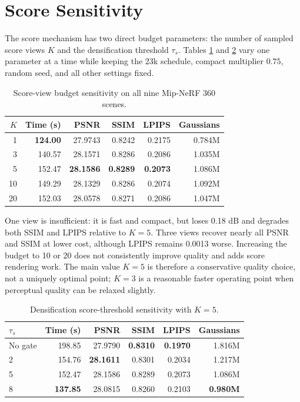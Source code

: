 \section{Score Sensitivity}

The score mechanism has two direct budget parameters: the number of sampled
score views $K$ and the densification threshold $\tau_s$. Tables
\ref{tab:score-view-sensitivity} and \ref{tab:score-threshold-sensitivity}
vary one parameter at a time while keeping the 23k schedule, compact multiplier
$0.75$, random seed, and all other settings fixed.

\begin{table}[H]
\centering
\caption{Score-view budget sensitivity on all nine Mip-NeRF 360 scenes.}
\label{tab:score-view-sensitivity}
\begin{tabular}{rrrrrr}
\toprule
$K$ & Time (s) & PSNR & SSIM & LPIPS & Gaussians \\
\midrule
1 & \textbf{124.00} & 27.9743 & 0.8242 & 0.2175 & 0.784M \\
3 & 140.57 & 28.1571 & 0.8286 & 0.2086 & 1.035M \\
5 & 152.47 & \textbf{28.1586} & \textbf{0.8289} & \textbf{0.2073} & 1.086M \\
10 & 149.29 & 28.1329 & 0.8286 & 0.2074 & 1.092M \\
20 & 152.03 & 28.0578 & 0.8271 & 0.2086 & 1.047M \\
\bottomrule
\end{tabular}
\end{table}

One view is insufficient: it is fast and compact, but loses 0.18 dB and
degrades both SSIM and LPIPS relative to $K=5$. Three views recover nearly all
PSNR and SSIM at lower cost, although LPIPS remains 0.0013 worse. Increasing
the budget to 10 or 20 does not consistently improve quality and adds score
rendering work. The main value $K=5$ is therefore a conservative quality
choice, not a uniquely optimal point; $K=3$ is a reasonable faster operating
point when perceptual quality can be relaxed slightly.

\begin{table}[H]
\centering
\caption{Densification score-threshold sensitivity with $K=5$.}
\label{tab:score-threshold-sensitivity}
\begin{tabular}{lrrrrr}
\toprule
$\tau_s$ & Time (s) & PSNR & SSIM & LPIPS & Gaussians \\
\midrule
No gate & 198.85 & 27.9790 & \textbf{0.8310} & \textbf{0.1970} & 1.816M \\
2 & 154.76 & \textbf{28.1611} & 0.8301 & 0.2034 & 1.217M \\
5 & 152.47 & 28.1586 & 0.8289 & 0.2073 & 1.086M \\
8 & \textbf{137.85} & 28.0815 & 0.8260 & 0.2103 & \textbf{0.980M} \\
\bottomrule
\end{tabular}
\end{table}

